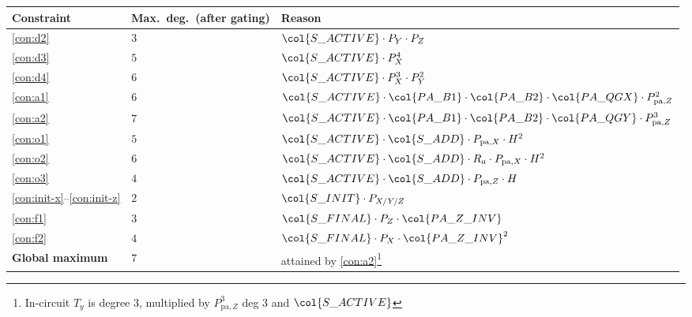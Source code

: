 \begin{center}
\small
\begin{tabular}{lll}
\toprule
\textbf{Constraint} & \textbf{Max.\ deg.\ (after gating)} & \textbf{Reason} \\
\midrule
\ref{con:d2}     & $3$ & $\col{S\_ACTIVE} \cdot P_Y \cdot P_Z$ \\
\ref{con:d3}     & $5$ & $\col{S\_ACTIVE} \cdot P_X^4$ \\
\ref{con:d4}     & $6$ & $\col{S\_ACTIVE} \cdot P_X^3 \cdot P_Y^2$ \\
\ref{con:a1}     & $6$ & $\col{S\_ACTIVE} \cdot \col{PA\_B1} \cdot \col{PA\_B2} \cdot \col{PA\_QGX} \cdot P_{\mathrm{pa},Z}^2$ \\
\ref{con:a2}     & $7$ & $\col{S\_ACTIVE} \cdot \col{PA\_B1} \cdot \col{PA\_B2} \cdot \col{PA\_QGY} \cdot P_{\mathrm{pa},Z}^3$ \\
\ref{con:o1}     & $5$ & $\col{S\_ACTIVE} \cdot \col{S\_ADD} \cdot P_{\mathrm{pa},X} \cdot H^2$ \\
\ref{con:o2}     & $6$ & $\col{S\_ACTIVE} \cdot \col{S\_ADD} \cdot R_a \cdot P_{\mathrm{pa},X} \cdot H^2$ \\
\ref{con:o3}     & $4$ & $\col{S\_ACTIVE} \cdot \col{S\_ADD} \cdot P_{\mathrm{pa},Z} \cdot H$ \\
\ref{con:init-x}--\ref{con:init-z} & $2$ & $\col{S\_INIT} \cdot P_{X/Y/Z}$ \\
\ref{con:f1}     & $3$ & $\col{S\_FINAL} \cdot P_Z \cdot \col{PA\_Z\_INV}$ \\
\ref{con:f2}     & $4$ & $\col{S\_FINAL} \cdot P_X \cdot \col{PA\_Z\_INV}^2$ \\
\midrule
\textbf{Global maximum} & \textbf{$7$} & attained by \ref{con:a2}\footnote{In-circuit $T_y$ is degree $3$, multiplied by $P_{\mathrm{pa},Z}^3$ deg $3$ and $\col{S\_ACTIVE}$} \\
\bottomrule
\end{tabular}
\end{center}
